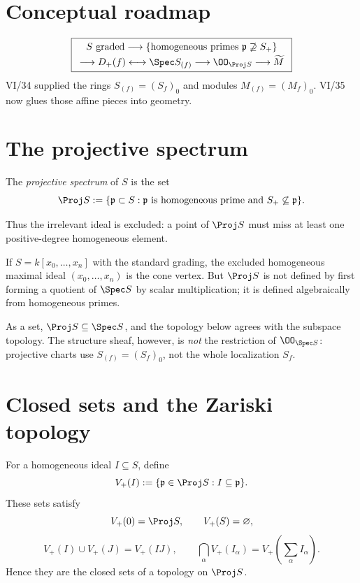 \section*{Conceptual roadmap}
\[
\boxed{
\begin{array}{c}
S\text{ graded}\longrightarrow
\{\text{homogeneous primes }\mathfrak p\not\supseteq S_+\}\\[2pt]
\longrightarrow D_+(f)\longleftrightarrow\Spec S_{(f)}
\longrightarrow \OO_{\Proj S}
\longrightarrow \widetilde M
\end{array}}
\]
VI/34 supplied the rings \(S_{(f)}=(S_f)_0\) and modules \(M_{(f)}=(M_f)_0\).  VI/35 now glues those affine pieces into geometry.



\section{The projective spectrum}
\begin{definition}
The \emph{projective spectrum} of \(S\) is the set
\[
\Proj S:=\{\mathfrak p\subset S:\mathfrak p\text{ is homogeneous prime and }S_+\not\subseteq\mathfrak p\}.
\]
\end{definition}
Thus the irrelevant ideal is excluded: a point of \(\Proj S\) must miss at least one positive-degree homogeneous element.

If \(S=k[x_0,\ldots,x_n]\) with the standard grading, the excluded homogeneous maximal ideal \((x_0,\ldots,x_n)\) is the cone vertex.  But \(\Proj S\) is not defined by first forming a quotient of \(\Spec S\) by scalar multiplication; it is defined algebraically from homogeneous primes.

\begin{remark}
As a set, \(\Proj S\subseteq\Spec S\), and the topology below agrees with the subspace topology.  The structure sheaf, however, is \emph{not} the restriction of \(\OO_{\Spec S}\): projective charts use \(S_{(f)}=(S_f)_0\), not the whole localization \(S_f\).
\end{remark}

\section{Closed sets and the Zariski topology}
For a homogeneous ideal \(I\subseteq S\), define
\[
V_+(I):=\{\mathfrak p\in\Proj S:I\subseteq\mathfrak p\}.
\]
These sets satisfy
\[
V_+(0)=\Proj S,\qquad V_+(S)=\varnothing,
\]
\[
V_+(I)\cup V_+(J)=V_+(IJ),\qquad
\bigcap_\alpha V_+(I_\alpha)=V_+\!\left(\sum_\alpha I_\alpha\right).
\]
Hence they are the closed sets of a topology on \(\Proj S\).

